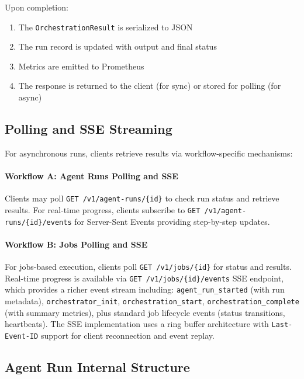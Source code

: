 \documentclass[a4paper,twoside]{sapthesis}
\begin{document}
Upon completion:

\begin{enumerate}
    \item The \texttt{OrchestrationResult} is serialized to JSON
    \item The run record is updated with output and final status
    \item Metrics are emitted to Prometheus
    \item The response is returned to the client (for sync) or stored for polling (for async)
\end{enumerate}

\subsection{Polling and SSE Streaming}

For asynchronous runs, clients retrieve results via workflow-specific mechanisms:

\paragraph{Workflow A: Agent Runs Polling and SSE} Clients may poll \texttt{GET /v1/agent-runs/\{id\}} to check run status and retrieve results. For real-time progress, clients subscribe to \texttt{GET /v1/agent-runs/\{id\}/events} for Server-Sent Events providing step-by-step updates.

\paragraph{Workflow B: Jobs Polling and SSE} For jobs-based execution, clients poll \texttt{GET /v1/jobs/\{id\}} for status and results. Real-time progress is available via \texttt{GET /v1/jobs/\{id\}/events} SSE endpoint, which provides a richer event stream including: \texttt{agent\_run\_started} (with run metadata), \texttt{orchestrator\_init}, \texttt{orchestration\_start}, \texttt{orchestration\_complete} (with summary metrics), plus standard job lifecycle events (status transitions, heartbeats). The SSE implementation uses a ring buffer architecture with \texttt{Last-Event-ID} support for client reconnection and event replay.

\subsection{Agent Run Internal Structure}
\label{subsec:agent-run-internal-structure}
\end{document}

